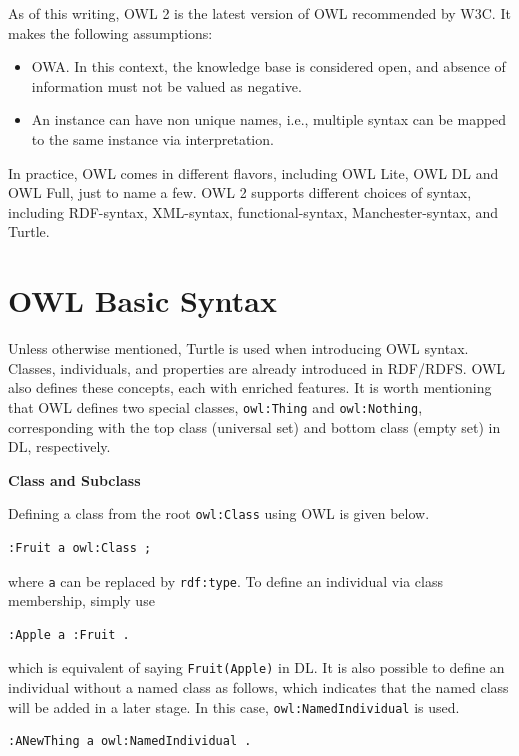 As of this writing, OWL 2 is the latest version of OWL recommended by W3C. It makes the following assumptions:
\begin{itemize}
	\item OWA. In this context, the knowledge base is considered open, and absence of information must not be valued as negative.
	\item An instance can have non unique names, i.e., multiple syntax can be mapped to the same instance via interpretation.
\end{itemize}

In practice, OWL comes in different flavors, including OWL Lite, OWL DL and OWL Full, just to name a few. OWL 2 supports different choices of syntax, including RDF-syntax, XML-syntax, functional-syntax, Manchester-syntax, and Turtle.

\section{OWL Basic Syntax}

Unless otherwise mentioned, Turtle is used when introducing OWL syntax. Classes, individuals, and properties are already introduced in RDF/RDFS. OWL also defines these concepts, each with enriched features. It is worth mentioning that OWL defines two special classes, \verb|owl:Thing| and \verb|owl:Nothing|, corresponding with the top class (universal set) and bottom class (empty set) in DL, respectively.

\vspace{0.1in}
\noindent \textbf{Class and Subclass}
\vspace{0.1in}

Defining a class from the root \verb|owl:Class| using OWL is given below.
\begin{lstlisting}
:Fruit a owl:Class ;
\end{lstlisting}
where \verb|a| can be replaced by \verb|rdf:type|. To define an individual via class membership, simply use
\begin{lstlisting}
:Apple a :Fruit .
\end{lstlisting}
which is equivalent of saying \verb|Fruit(Apple)| in DL. It is also possible to define an individual without a named class as follows, which indicates that the named class will be added in a later stage. In this case, \verb|owl:NamedIndividual| is used.
\begin{lstlisting}
:ANewThing a owl:NamedIndividual .
\end{lstlisting}

